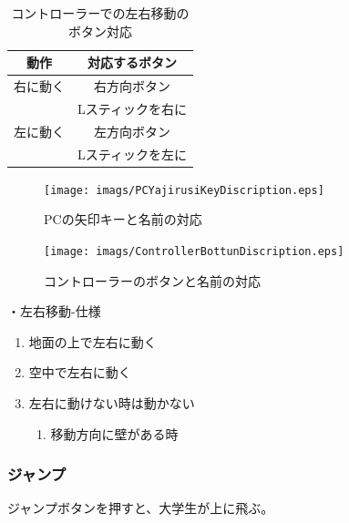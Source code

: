 \documentclass[12pt]{jsarticle}
\begin{document}
\begin{table}[htbp]
  \centering
  \caption{コントローラーでの左右移動のボタン対応}
  \begin{tabular}{c|c}
    \hline
    動作 & 対応するボタン\\
    \hline
    右に動く & 右方向ボタン \\
      & Lスティックを右に \\
    \hline
    左に動く & 左方向ボタン \\
      & Lスティックを左に \\
    \hline
  \end{tabular}
\end{table}

\newpage

\begin{figure}[htbp]
  \begin{center}
    \texttt{[image: imags/PCYajirusiKeyDiscription.eps]}
    \caption{PCの矢印キーと名前の対応}
  \end{center}
  \begin{center}
    \texttt{[image: imags/ControllerBottunDiscription.eps]}
    \caption{コントローラーのボタンと名前の対応}
  \end{center}
\end{figure}

\newpage

・左右移動-仕様
\begin{enumerate}
  \item 地面の上で左右に動く
  \item 空中で左右に動く
  \item 左右に動けない時は動かない
  \begin{enumerate}
    \item 移動方向に壁がある時
  \end{enumerate}
\end{enumerate}

\newpage

\subsubsection{ジャンプ}

ジャンプボタンを押すと、大学生が上に飛ぶ。
\end{document}
